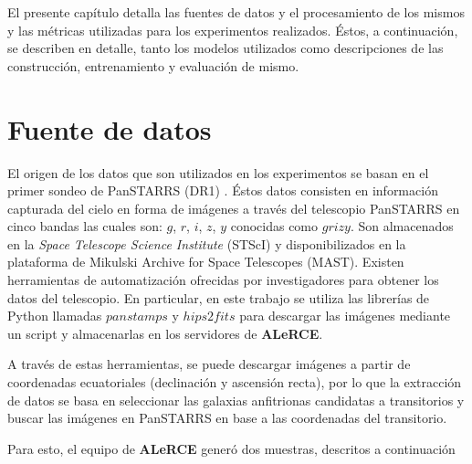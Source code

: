 \documentclass[../tesis.tex]{subfiles}
\begin{document}
El presente capítulo detalla las fuentes de datos y el procesamiento de los mismos y las métricas utilizadas para los experimentos realizados. Éstos, a continuación, se describen en detalle, tanto los modelos utilizados como descripciones de las construcción, entrenamiento y evaluación de mismo.


\section{Fuente de datos}
El origen de los datos que son utilizados en los experimentos se basan en el primer sondeo de PanSTARRS (DR1) \cite{panstarrs}. Éstos datos consisten en información capturada del cielo en forma de imágenes a través del telescopio PanSTARRS en cinco bandas las cuales son: $g$, $r$, $i$, $z$, $y$ conocidas como $grizy$. Son almacenados en la \textit{Space Telescope Science Institute} (STScI) y disponibilizados en la plataforma de Mikulski Archive for Space Telescopes (MAST). Existen herramientas de automatización ofrecidas por investigadores para obtener los datos del telescopio. En particular, en este trabajo se utiliza las librerías de Python llamadas $panstamps$ y $hips2fits$ para descargar las imágenes mediante un script y almacenarlas en los servidores de \textbf{ALeRCE}.\par\null\par

A través de estas herramientas, se puede descargar imágenes a partir de coordenadas ecuatoriales (declinación y ascensión recta), por lo que la extracción de datos se basa en seleccionar las galaxias anfitrionas candidatas a transitorios y buscar las imágenes en PanSTARRS en base a las coordenadas del transitorio.\par\null\par

Para esto, el equipo de \textbf{ALeRCE} generó dos muestras, descritos a continuación
\end{document}
